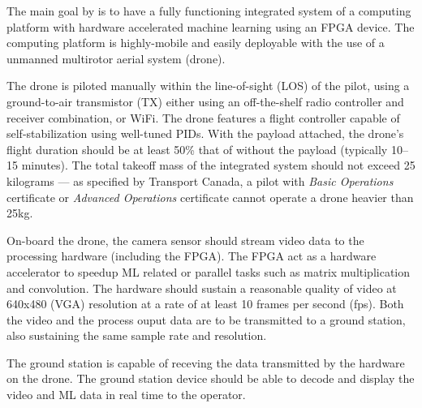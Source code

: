 The main goal by is to have a fully functioning integrated system of a computing platform with hardware accelerated machine learning using an FPGA device. 
The computing platform is highly-mobile and easily deployable with the use of a unmanned multirotor aerial system (drone). 

The drone is piloted manually within the line-of-sight (LOS) of the pilot, using a ground-to-air transmistor (TX) either using an off-the-shelf radio controller and receiver combination, or WiFi. 
The drone features a flight controller capable of self-stabilization using well-tuned PIDs.
With the payload attached, the drone's flight duration should be at least 50\% that of without the payload (typically 10--15 minutes).
The total takeoff mass of the integrated system should not exceed 25 kilograms --- as specified by Transport Canada, a pilot with \textit{Basic Operations}
certificate or \textit{Advanced Operations} certificate cannot operate a drone heavier than 25kg.

On-board the drone, the camera sensor should stream video data to the processing hardware (including the FPGA). 
The FPGA act as a hardware accelerator to speedup ML related or parallel tasks such as matrix multiplication and convolution.
The hardware should sustain a reasonable quality of video at 640x480 (VGA) resolution at a rate of at least 10 frames per second (fps).
Both the video and the process ouput data are to be transmitted to a ground station, also sustaining the same sample rate and resolution.

The ground station is capable of receving the data transmitted by the hardware on the drone. The ground station device should be able
to decode and display the video and ML data in real time to the operator.
